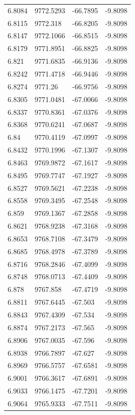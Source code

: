 \begin{table}[H]
\begin{tabular}{llll}
6.8084 & 9772.5293 & -66.7895 & -9.8098 \\
6.8115 & 9772.318 & -66.8205 & -9.8098 \\
6.8147 & 9772.1066 & -66.8515 & -9.8098 \\
6.8179 & 9771.8951 & -66.8825 & -9.8098 \\
6.821 & 9771.6835 & -66.9136 & -9.8098 \\
6.8242 & 9771.4718 & -66.9446 & -9.8098 \\
6.8274 & 9771.26 & -66.9756 & -9.8098 \\
6.8305 & 9771.0481 & -67.0066 & -9.8098 \\
6.8337 & 9770.8361 & -67.0376 & -9.8098 \\
6.8368 & 9770.6241 & -67.0687 & -9.8098 \\
6.84 & 9770.4119 & -67.0997 & -9.8098 \\
6.8432 & 9770.1996 & -67.1307 & -9.8098 \\
6.8463 & 9769.9872 & -67.1617 & -9.8098 \\
6.8495 & 9769.7747 & -67.1927 & -9.8098 \\
6.8527 & 9769.5621 & -67.2238 & -9.8098 \\
6.8558 & 9769.3495 & -67.2548 & -9.8098 \\
6.859 & 9769.1367 & -67.2858 & -9.8098 \\
6.8621 & 9768.9238 & -67.3168 & -9.8098 \\
6.8653 & 9768.7108 & -67.3479 & -9.8098 \\
6.8685 & 9768.4978 & -67.3789 & -9.8098 \\
6.8716 & 9768.2846 & -67.4099 & -9.8098 \\
6.8748 & 9768.0713 & -67.4409 & -9.8098 \\
6.878 & 9767.858 & -67.4719 & -9.8098 \\
6.8811 & 9767.6445 & -67.503 & -9.8098 \\
6.8843 & 9767.4309 & -67.534 & -9.8098 \\
6.8874 & 9767.2173 & -67.565 & -9.8098 \\
6.8906 & 9767.0035 & -67.596 & -9.8098 \\
6.8938 & 9766.7897 & -67.627 & -9.8098 \\
6.8969 & 9766.5757 & -67.6581 & -9.8098 \\
6.9001 & 9766.3617 & -67.6891 & -9.8098 \\
6.9033 & 9766.1475 & -67.7201 & -9.8098 \\
6.9064 & 9765.9333 & -67.7511 & -9.8098 \\

\end{tabular}
\end{table}
